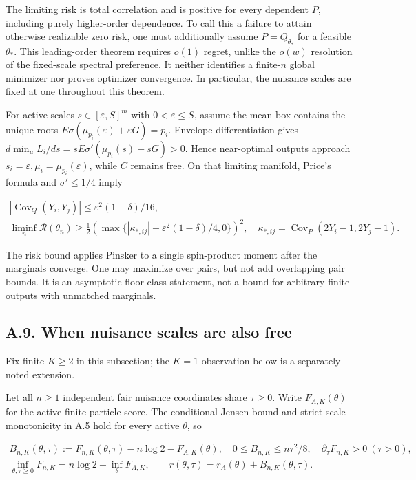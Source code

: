 \documentclass{article}
\begin{document}
The limiting risk is total correlation and is positive for every
dependent \(P\), including purely higher-order dependence. To call this
a failure to attain otherwise realizable zero risk, one must
additionally assume \(P=Q_{\theta_*}\) for a feasible \(\theta_*\). This
leading-order theorem requires \(o(1)\) regret, unlike the \(o(w)\)
resolution of the fixed-scale spectral preference. It neither identifies
a finite-\(n\) global minimizer nor proves optimizer convergence. In
particular, the nuisance scales are fixed at one throughout this
theorem.

For active scales \(s\in[\varepsilon,S]^m\) with \(0<\varepsilon\le S\),
assume the mean box contains the unique roots
\(E\sigma(\mu_{p_i}(\varepsilon)+\varepsilon G)=p_i\). Envelope
differentiation gives \(d\min_\mu L_i/ds=sE\sigma'(\mu_{p_i}(s)+sG)>0\).
Hence near-optimal outputs approach
\(s_i=\varepsilon,\mu_i=\mu_{p_i}(\varepsilon)\), while \(C\) remains
free. On that limiting manifold, Price's formula and \(\sigma'\le1/4\)
imply

\[
\begin{gathered}
|\operatorname{Cov}_Q(Y_i,Y_j)|\le\varepsilon^2(1-\delta)/16,\\
\liminf_n\mathcal R(\theta_n)\ge\tfrac12
\left(\max\{|\kappa_{*,ij}|-\varepsilon^2(1-\delta)/4,0\}\right)^2,
\quad \kappa_{*,ij}=\operatorname{Cov}_P(2Y_i-1,2Y_j-1).
\end{gathered}
\tag{A.45}
\]

The risk bound applies Pinsker to a single spin-product moment after the
marginals converge. One may maximize over pairs, but not add overlapping
pair bounds. It is an asymptotic floor-class statement, not a bound for
arbitrary finite outputs with unmatched marginals.

\subsection*{A.9. When nuisance scales are also
free}\label{a.9.-when-nuisance-scales-are-also-free}

Fix finite \(K\ge2\) in this subsection; the \(K=1\) observation below
is a separately noted extension.

Let all \(n\ge1\) independent fair nuisance coordinates share
\(\tau\ge0\). Write \(F_{A,K}(\theta)\) for the active finite-particle
score. The conditional Jensen bound and strict scale monotonicity in A.5
hold for every active \(\theta\), so

\[
\begin{gathered}
B_{n,K}(\theta,\tau):=F_{n,K}(\theta,\tau)-n\log2-F_{A,K}(\theta),\quad
0\le B_{n,K}\le n\tau^2/8,\quad \partial_\tau F_{n,K}>0\ (\tau>0),\\
\inf_{\theta,\tau\ge0}F_{n,K}=n\log2+\inf_\theta F_{A,K},\qquad
r(\theta,\tau)=r_A(\theta)+B_{n,K}(\theta,\tau).
\end{gathered}
\tag{A.46}
\]
\end{document}
